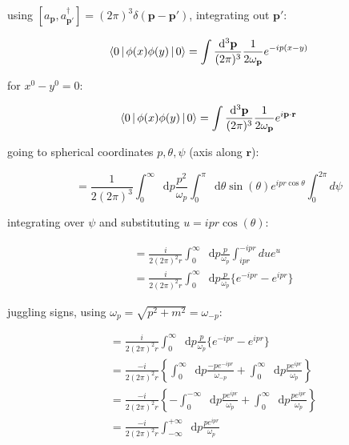 \documentclass[aspectratio=169]{beamer}
\newcommand{\sqrtpm}{\sqrt{p^2 + m^2}}
\newcommand{\vp}{\mathbf{p}}
\newcommand{\vr}{\mathbf{r}}
\newcommand{\vpp}{\mathbf{p}'}
\newcommand{\omp}{\omega_{p}}
\newcommand{\ommp}{\omega_{-p}}
\newcommand{\omvp}{\omega_{\vp}}
\newcommand{\ap}{a_{\vp}}
\newcommand{\adpp}{a^\dagger_{\vpp}}
\newcommand{\diffop}{\mathop{}\!\mathrm{d}}
\newcommand{\dip}{\diffop p}
\newcommand{\dtheta}{\diffop \theta}
\newcommand{\intpthree}{\int \frac{\diffop^3\vp}{(2\pi)^3}}
\newcommand{\com}[2]{[{#1},{#2}]}
\newcommand{\phixy}{\Braket{0|\phi(x)\phi(y)|0}}
\newcommand{\intii}{\int_{-\infty}^{+\infty}}
\begin{document}
\begin{frame}
using $\com{\ap}{\adpp} = (2\pi)^3 \delta(\vp - \vpp)$, integrating out $\vpp$:

\begin{equation*}
\phixy = \intpthree \frac{1}{2\omvp} e^{-ip(x-y)}
\end{equation*}

for $x^0 - y^0 = 0$:

\begin{equation*}
\phixy = \intpthree \frac{1}{2\omvp} e^{i\vp\cdot\vr}
\end{equation*}
\end{frame}


\begin{frame}
going to spherical coordinates $p, \theta, \psi$ (axis along $\vr$):

\begin{equation*}
= \frac{1}{2(2\pi)^3} \int_0^\infty \dip \frac{p^2}{\omp} \int_0^\pi \dtheta \sin(\theta) e^{ipr\cos{\theta}}
\int_0^{2\pi} d\psi
\end{equation*}

integrating over $\psi$ and substituting $u = ipr\cos(\theta)$:

\begin{equation*}
\begin{split}
& = \frac{i}{2(2\pi)^2 r} \int_0^\infty \dip \frac{p}{\omp} \int_{ipr}^{-ipr} du e^{u} \\
& = \frac{i}{2(2\pi)^2 r} \int_0^\infty \dip \frac{p}{\omp} \big\{ e^{-ipr} - e^{ipr} \big\}
\end{split}
\end{equation*}

\end{frame}


\begin{frame}

juggling signs, using $\omp = \sqrtpm = \ommp$:

\begin{equation*}
\begin{split}
& = \frac{i}{2(2\pi)^2 r} \int_0^\infty \dip \frac{p}{\omp} \big\{ e^{-ipr} - e^{ipr} \big\} \\
& = \frac{-i}{2(2\pi)^2 r} \left\{ \int_0^\infty \dip \frac{-p e^{-ipr}}{\ommp} + \int_0^\infty \dip \frac{p e^{ipr}}{\omp} \right\} \\
& = \frac{-i}{2(2\pi)^2 r} \left\{ -\int_0^{-\infty} \dip \frac{p e^{ipr}}{\omp} + \int_0^\infty \dip \frac{p e^{ipr}}{\omp} \right\} \\
& = \frac{-i}{2(2\pi)^2 r} \intii \dip \frac{p e^{ipr}}{\omp}
\end{split}
\end{equation*}
\end{frame}
\end{document}
